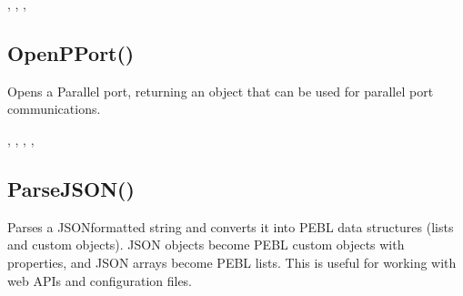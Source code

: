 \documentclass[letterpaper,10pt,english]{sphinxmanual}
\begin{document}
\sphinxAtStartPar
{}

\sphinxAtStartPar
{}, , , 

\ignorespaces 

\subsection{OpenPPort()}
\label{\detokenize{reference/peblstream:openpport}}\label{\detokenize{reference/peblstream:index-28}}
\sphinxAtStartPar
{}

\sphinxAtStartPar
{}

\sphinxAtStartPar
Opens a Parallel  port, returning an object that can be used for parallel port communications.

\sphinxAtStartPar
{}

\sphinxAtStartPar
{}, , , , 

\ignorespaces 

\subsection{ParseJSON()}
\label{\detokenize{reference/peblstream:parsejson}}\label{\detokenize{reference/peblstream:index-29}}
\sphinxAtStartPar
{}

\sphinxAtStartPar
{}

\sphinxAtStartPar
Parses a JSON\sphinxhyphen{}formatted string and converts it into PEBL data structures (lists and custom objects). JSON objects become PEBL custom objects with properties, and JSON arrays become PEBL lists. This is useful for working with web APIs and configuration files.

\sphinxAtStartPar
{}

\begin{sphinxVerbatim}[commandchars=\\\{\}]
\end{sphinxVerbatim}
\end{document}
